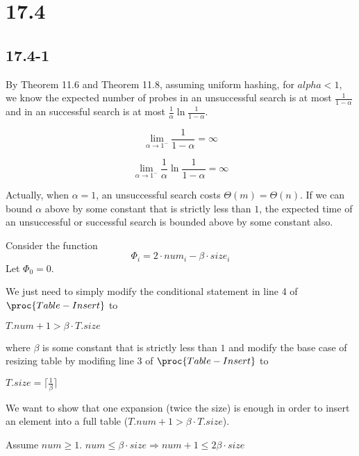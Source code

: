 \section*{17.4}

\subsection*{17.4-1}

By Theorem 11.6 and Theorem 11.8, assuming uniform hashing,
for $alpha < 1$, we know the expected number of probes 
in an unsuccessful search is at most $\frac{1}{1 - \alpha}$
and in an successful search is at most 
$\frac{1}{\alpha} \ln \frac{1}{1 - \alpha}$.

\begin{equation*}
    \lim\limits_{\alpha \rightarrow 1^-} \frac{1}{1 - \alpha} = \infty
\end{equation*}

\begin{equation*}
    \lim\limits_{\alpha \rightarrow 1^-} 
    \frac{1}{\alpha} \ln \frac{1}{1 - \alpha} = \infty
\end{equation*}

Actually, when $\alpha = 1$, an unsuccessful search costs 
$\Theta(m) = \Theta(n)$.
If we can bound $\alpha$ above by some constant 
that is strictly less than $1$,
the expected time of an unsuccessful or successful search is bounded above
by some constant also.

Consider the function
\begin{equation*}
    \Phi_i = 2 \cdot num_i - \beta \cdot size_i
\end{equation*}
Let $\Phi_0 = 0$.

We just need to simply modify the conditional statement 
in line 4 of $\proc{Table-Insert}$ to 
\begin{codebox}
    \zi \If $T.num + 1 > \beta \cdot T.size$
\end{codebox}
where $\beta$ is some constant that is strictly less than $1$
and modify the base case of resizing table
by modifing line 3 of $\proc{Table-Insert}$ to 
\begin{codebox}
    \zi \If $T.size = \lceil \frac{1}{\beta} \rceil$
\end{codebox}

We want to show that one expansion (twice the size) is enough
in order to insert an element into a full table ($T.num + 1 > \beta \cdot T.size$).

\begin{lemma}
    Assume $num \geq 1$.
    $num \leq \beta \cdot size \Longrightarrow
    num + 1 \leq 2 \beta \cdot size$ 
\end{lemma}


